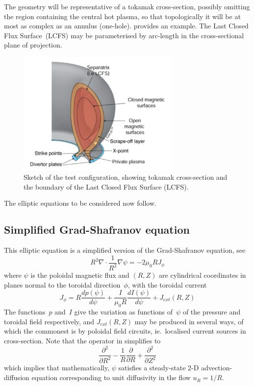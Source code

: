 The geometry will be representative of a tokamak cross-section, possibly
omitting
the region containing the central hot plasma, so that topologically it
will be at most as complex as an annulus (one-hole). 
provides an example. 
The Last Closed Flux Surface~(LCFS) may be parameterised by arc-length
in the cross-sectional plane of projection.

\begin{figure}
\centerline{
\includegraphics[width=8.0cm]{../png/xsect}
}
\caption{Sketch of the test configuration, showing tokamak cross-section
and the boundary of the Last Closed Flux Surface (LCFS).
\label{fig:xsect}}
\end{figure}

The elliptic equations to be considered now follow.

\subsection{Simplified Grad-Shafranov equation} \label{sec:GSimp}
This elliptic equation is a simplified version
of the Grad-Shafranov equation, see \cite{Ap18Equi}
\begin{equation}\label{eq:gs}
R^2 \nabla \cdot \frac{1}{R^2} \nabla \psi = -2 \mu_0 R J_{\phi}
\end{equation}
where $\psi$ is the poloidal magnetic flux and $(R,Z)$ are cylindrical coordinates
in planes normal to the toroidal direction~$\phi$, with the toroidal current
\begin{equation}\label{eq:jphi}
J_\phi= R \frac{dp(\psi)}{d\psi}+ \frac{I}{\mu_0 R} \frac{dI(\psi)}{d\psi} + J_{ext}(R,Z)
\end{equation}
The functions~$p$ and~$I$ give the variation as functions of~$\psi$
of the pressure and toroidal field respectively, and $J_{ext}(R,Z)$
may be produced in several ways, of which the commonest is by
poloidal field circuits, ie.\ localised current sources in cross-section.
Note that the operator in  simplifies to
\begin{equation}\label{eq:gsimp}
\frac{\partial^2}{\partial R^2} - \frac{1}{R}  \frac{\partial}{\partial R} + \frac{\partial^2}{\partial Z^2}
\end{equation}
which implies that mathematically, $\psi$ satisfies a steady-state 2-D advection-diffusion
equation corresponding to unit diffusivity in the flow $u_R=1/R$.

